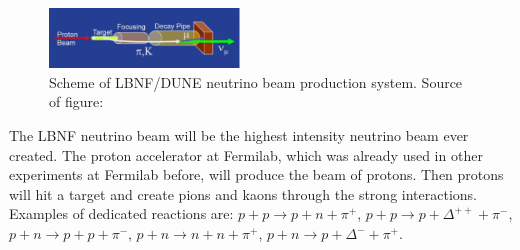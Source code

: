 \begin{figure}
\caption{Scheme of LBNF/DUNE neutrino beam production system. Source of figure: \cite{ref_LBNFweb}}
\label{fig:LBNF_nuBeam}
\centering
\includegraphics[width=0.45\textwidth, keepaspectratio=true]{figs/LBNF_nuBeam.png}  
\end{figure}
The LBNF neutrino beam will be the highest intensity neutrino beam ever created. The proton accelerator at Fermilab, which was already used in other experiments at Fermilab before, will produce the beam of protons. Then protons will hit a target and create pions and kaons through the strong interactions. Examples of dedicated reactions are: $p+p \rightarrow p+n+\pi^+$, $p+p \rightarrow p+\Delta^{++}+\pi^-$, $p+n \rightarrow p+p+\pi^-$, $p+n \rightarrow n+n+\pi^+$, $p+n \rightarrow p+\Delta^{-}+\pi^+$. \\ \\

